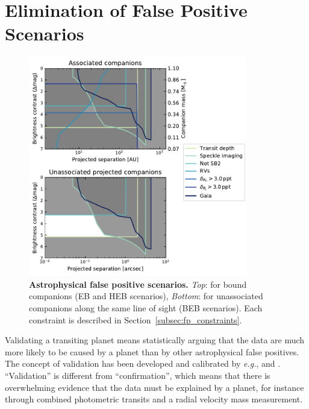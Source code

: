 \documentclass[12pt,twocolumn,tighten]{aastex63}
\begin{document}
\section{Elimination of False Positive Scenarios}
\label{sec:validation}

\begin{figure}[!t]
	\begin{center}
		\leavevmode
		\includegraphics[width=0.85\textwidth]{f4.pdf}
	\end{center}
	\vspace{-0.7cm}
	\caption{
		{\bf Astrophysical false positive scenarios.}
    {\it Top}: for bound companions (EB and HEB scenarios),
		{\it Bottom}: for unassociated companions along the same line of
    sight (BEB scenarios).
		Each constraint is described in Section~\ref{subsec:fp_constraints}.
		\label{fig:fpscenario}
	}
\end{figure}

Validating a transiting planet means statistically arguing that
the data are much more likely to be caused by a planet than by other
astrophysical false positives. The concept of validation has been
developed and calibrated by {\it e.g.},
\citet{torres_modeling_2011,morton_efficient_2012,diaz_pastis_2014,santerne_pastis_2015,morton_false_2016}
and \citet{giacalone_triceratops_2020}.  ``Validation'' is different
from ``confirmation'', which means that there is overwhelming evidence
that the data must be explained by a planet, for instance through
combined photometric transits and a radial velocity mass measurement.
\end{document}
